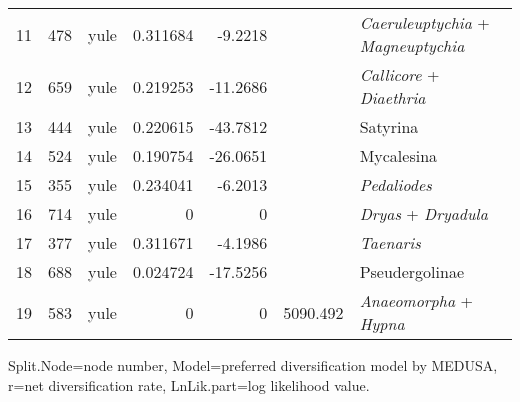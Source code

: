 \documentclass[10pt]{article}
\begin{document}
\begin{table}[!h]
\begin{tabular}{lccrrcl}
11              & 478        & yule  & 0.311684   & -9.2218    &          & \emph{Caeruleuptychia} + \emph{Magneuptychia}              \\
12              & 659        & yule  & 0.219253   & -11.2686   &          & \emph{Callicore} + \emph{Diaethria}                        \\
13              & 444        & yule  & 0.220615   & -43.7812   &          & Satyrina                                                   \\
14              & 524        & yule  & 0.190754   & -26.0651   &          & Mycalesina                                                 \\
15              & 355        & yule  & 0.234041   & -6.2013    &          & \emph{Pedaliodes}                                          \\
16              & 714        & yule  & 0          & 0          &          & \emph{Dryas} + \emph{Dryadula}                             \\
17              & 377        & yule  & 0.311671   & -4.1986    &          & \emph{Taenaris}                                            \\
18              & 688        & yule  & 0.024724   & -17.5256   &          & Pseudergolinae                                             \\
19              & 583        & yule  & 0          & 0          & 5090.492 & \emph{Anaeomorpha} + \emph{Hypna}                                       
\end{tabular}
\begin{flushleft}Split.Node=node number, Model=preferred diversification model by MEDUSA, r=net diversification rate, LnLik.part=log likelihood value.
\end{flushleft}
\end{table}
\end{document}
